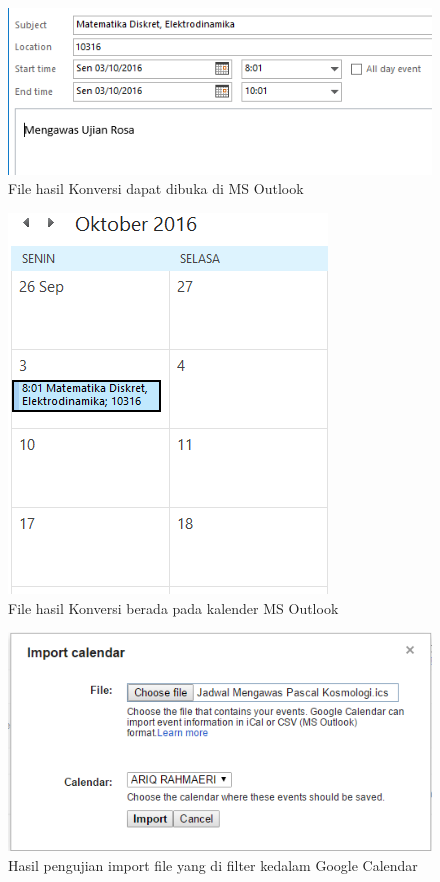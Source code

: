 			\begin{figure}[H]
			\centering
			\includegraphics[scale=0.8]{Gambar/hasilOutlookEksperimental2}
			\caption{File hasil Konversi dapat dibuka di MS Outlook}
			\label{fig:hasilOutlookEksperimental2}
			\end{figure}
			
			\begin{figure}[H]
			\centering
			\includegraphics[scale=0.8]{Gambar/hasilOutlookEksperimental}
			\caption{File hasil Konversi berada pada kalender MS Outlook}
			\label{fig:hasilOutlookEksperimental}
			\end{figure}
		
	
			\begin{figure}[H]
			\centering
			\includegraphics[scale=0.8]{Gambar/importGCFilterEksperimental}
			\caption{Hasil pengujian import file yang di filter kedalam Google Calendar }
			\label{fig:importGCFilterEksperimental}
			\end{figure}
			
